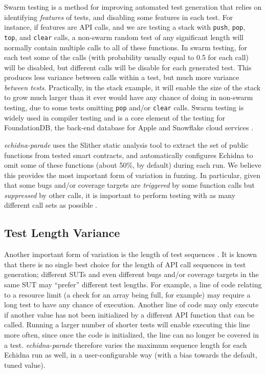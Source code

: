 \documentclass[sigconf]{acmart}
\begin{document}
{Swarm testing \cite{ISSTA12} is a method for improving automated test
generation that relies on identifying \emph{features} of tests, and
disabling some features in each test.  For instance, if features are
API calls, and we are testing a stack with {\tt push}, {\tt pop}, {\tt
  top}, and {\tt clear} calls, a non-swarm random test of any
significant length will normally contain multiple calls to all of
these functions.  In swarm testing, for each test some of the calls
(with probability usually equal to 0.5 for each call) will be
disabled, but different calls will be disable for each generated
test.  This produces less variance between calls within a test, but
much more variance \emph{between tests}.  Practically, in the stack
example, it will enable the size of the stack to grow much larger than
it ever would have any chance of doing in non-swarm testing, due to
some tests omitting {\tt pop} and/or {\tt clear} calls.  Swarm testing
is widely used in compiler testing
\cite{le2014compiler,dewey2015fuzzing} and is a core element of the
testing for FoundationDB, the back-end database for Apple and
Snowflake cloud services \cite{zhou2021foundationdb}.

\emph{echidna-parade} uses the Slither static analysis tool to extract
the set of public functions from tested smart contracts, and
automatically configures Echidna to omit some of these functions
(about 50\%, by default)
during each run.  We believe this provides the most important form of variation
in fuzzing.  In particular, given that some bugs and/or coverage
targets are \emph{triggered} by some function calls but
\emph{suppressed} by other calls, it is important to perform testing
with as many different call sets as possible \cite{groce2013help}.


\subsection{Test Length Variance}

Another important form of variation is the length of test sequences \cite{ASE08,ArcuriLen}.  It is
known that there is no single best choice for the length of API call
sequences in test generation; different SUTs and even different bugs
and/or coverage targets in the same SUT may ``prefer'' different test
lengths.  For example, a line of code relating to a resource limit (a
check for an array being full, for example) may require a long test to
have any chance of execution.  Another line of code may only execute
if another value has not been initialized by a different API function
that can be called.  Running a larger number of shorter tests will enable executing
this line more often, since once the code is initialized, the line can
no longer be covered in a test.  \emph{echidna-parade} therefore
varies the maximum sequence length for each Echidna run as well, in a
user-configurable way (with a bias towards the default, tuned value).

}
\end{document}
